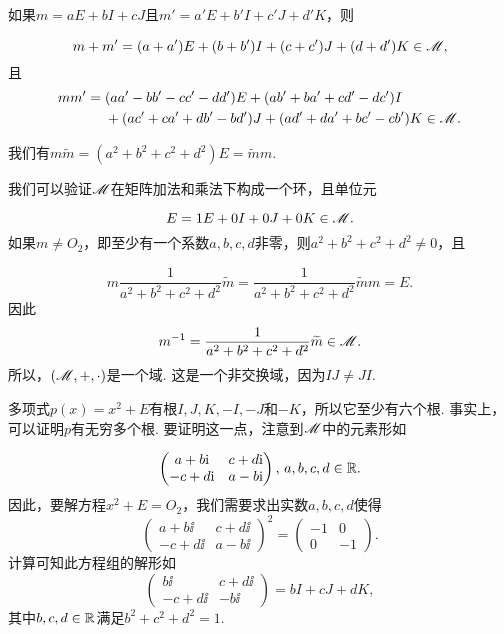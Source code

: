 \begin{solution}
  \begin{enuma}
    \item 如果$m=aE+bI+cJ$且$m'=a'E+b'I+c'J+d'K$，则
  \end{enuma}
  \[
    m + m' = (a + a')E + (b + b')I + (c + c')J
    + (d + d')K \in \mathscr M,
  \]
  且
  \begin{align*}
    mm' = {}& (aa' - bb' - cc' - dd')E + (ab' + ba' + cd' - dc') I \\
    & + (ac' + ca' + db' - bd')J + (ad' + da' + bc' - cb') K \in\mathscr M.
  \end{align*}

  我们有$m\widetilde m =(a^2+b^2+c^2+d^2)E=\widetilde mm$.

  \begin{enuma}
    \setcounter{enumi}{1}
    \item 我们可以验证$\mathscr M$在矩阵加法和乘法下构成一个环，且单位元
  \end{enuma}
        \[
          E=1E+0I+0J+0K\in\mathscr M.
        \]
        如果$m\ne O_2$，即至少有一个系数$a,b,c,d$非零，则$a^2+b^2+c^2+d^2\ne0$，且

    \[
      m\frac1{a^2+b^2+c^2+d^2}\widetilde m =
      \frac1{a^2+b^2+c^2+d^2}\widetilde mm = E.
    \]
    因此
    \[
      m^{-1} = \frac1{a^2+b^2+c^2+d^2}\widetilde m \in \mathscr M.
    \]
    所以，$(\mathscr M,+,\cdot)$是一个域. 这是一个非交换域，因为$IJ\ne JI$.

  \begin{enuma}
    \setcounter{enumi}{2}
    \item 多项式$p(x)=x^2+E$有根$I,J,K,-I,-J$和$-K$，所以它至少有六个根. 事实上，可以证明$p$有无穷多个根. 要证明这一点，注意到$\mathscr M$中的元素形如
  \end{enuma}
    \[
      \begin{pmatrix}
        a + b\mathrm i & c + d\mathrm i\\
        -c + d\mathrm i & a - b\mathrm i
      \end{pmatrix},\,a,b,c,d\in\mathbb R.
    \]
    因此，要解方程$x^2+E=O_2$，我们需要求出实数$a,b,c,d$使得
    \[
      \begin{pmatrix}
        a + b\ii & c + d\ii\\
        -c + d\ii & a - b\ii
      \end{pmatrix}^2
      = \begin{pmatrix}
        -1 & 0 \\
        0 & -1
      \end{pmatrix}.
    \]
    计算可知此方程组的解形如
    \[
      \begin{pmatrix}
        b\ii & c + d\ii \\
        -c + d\ii & -b\ii
      \end{pmatrix} = bI + cJ + dK,
    \]
    其中$b,c,d\in\mathbb R$满足$b^2+c^2+d^2=1$.
\end{solution}







